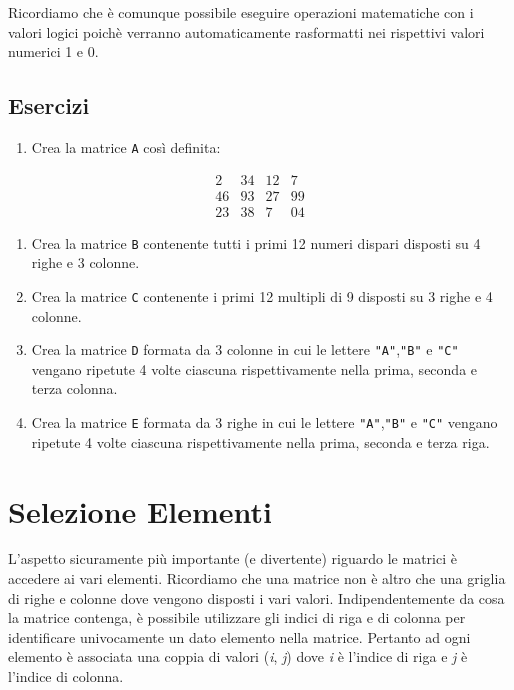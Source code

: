 \documentclass[
]{book}
\providecommand{\tightlist}{%
  \setlength{\itemsep}{0pt}\setlength{\parskip}{0pt}}
\begin{document}
Ricordiamo che è comunque possibile eseguire operazioni matematiche con i valori logici poichè verranno automaticamente rasformatti nei rispettivi valori numerici 1 e 0.

\hypertarget{esercizi-6}{%
\subsection*{Esercizi}\label{esercizi-6}}

\begin{enumerate}
\def\labelenumi{\arabic{enumi}.}
\tightlist
\item
  Crea la matrice \texttt{A} così definita:
\end{enumerate}

\[
\begin{matrix}
2 & 34 & 12 & 7\\
46 & 93 & 27 & 99\\
23  & 38 & 7 & 04
\end{matrix}
\]

\begin{enumerate}
\def\labelenumi{\arabic{enumi}.}
\setcounter{enumi}{1}
\tightlist
\item
  Crea la matrice \texttt{B} contenente tutti i primi 12 numeri dispari disposti su 4 righe e 3 colonne.
\item
  Crea la matrice \texttt{C} contenente i primi 12 multipli di 9 disposti su 3 righe e 4 colonne.
\item
  Crea la matrice \texttt{D} formata da 3 colonne in cui le lettere \texttt{"A"},\texttt{"B"} e \texttt{"C"} vengano ripetute 4 volte ciascuna rispettivamente nella prima, seconda e terza colonna.
\item
  Crea la matrice \texttt{E} formata da 3 righe in cui le lettere \texttt{"A"},\texttt{"B"} e \texttt{"C"} vengano ripetute 4 volte ciascuna rispettivamente nella prima, seconda e terza riga.
\end{enumerate}

\hypertarget{sel-matrix}{%
\section{Selezione Elementi}\label{sel-matrix}}

L'aspetto sicuramente più importante (e divertente) riguardo le matrici è accedere ai vari elementi. Ricordiamo che una matrice non è altro che una griglia di righe e colonne dove vengono disposti i vari valori. Indipendentemente da cosa la matrice contenga, è possibile utilizzare gli indici di riga e di colonna per identificare univocamente un dato elemento nella matrice. Pertanto ad ogni elemento è associata una coppia di valori (\emph{i}, \emph{j}) dove \emph{i} è l'indice di riga e \emph{j} è l'indice di colonna.
\end{document}

